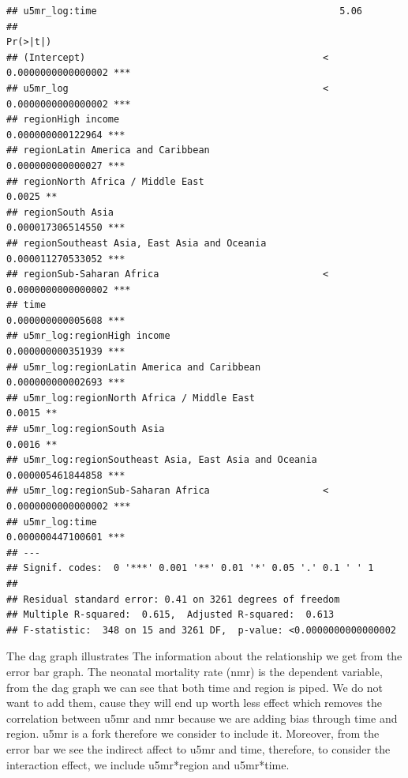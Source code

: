 \documentclass[
]{article}
\begin{document}
\begin{verbatim}
## u5mr_log:time                                           5.06
##                                                                  Pr(>|t|)    
## (Intercept)                                          < 0.0000000000000002 ***
## u5mr_log                                             < 0.0000000000000002 ***
## regionHigh income                                       0.000000000122964 ***
## regionLatin America and Caribbean                       0.000000000000027 ***
## regionNorth Africa / Middle East                                   0.0025 ** 
## regionSouth Asia                                        0.000017306514550 ***
## regionSoutheast Asia, East Asia and Oceania             0.000011270533052 ***
## regionSub-Saharan Africa                             < 0.0000000000000002 ***
## time                                                    0.000000000005608 ***
## u5mr_log:regionHigh income                              0.000000000351939 ***
## u5mr_log:regionLatin America and Caribbean              0.000000000002693 ***
## u5mr_log:regionNorth Africa / Middle East                          0.0015 ** 
## u5mr_log:regionSouth Asia                                          0.0016 ** 
## u5mr_log:regionSoutheast Asia, East Asia and Oceania    0.000005461844858 ***
## u5mr_log:regionSub-Saharan Africa                    < 0.0000000000000002 ***
## u5mr_log:time                                           0.000000447100601 ***
## ---
## Signif. codes:  0 '***' 0.001 '**' 0.01 '*' 0.05 '.' 0.1 ' ' 1
## 
## Residual standard error: 0.41 on 3261 degrees of freedom
## Multiple R-squared:  0.615,  Adjusted R-squared:  0.613 
## F-statistic:  348 on 15 and 3261 DF,  p-value: <0.0000000000000002
\end{verbatim}

The dag graph illustrates The information about the relationship we get
from the error bar graph. The neonatal mortality rate (nmr) is the
dependent variable, from the dag graph we can see that both time and
region is piped. We do not want to add them, cause they will end up
worth less effect which removes the correlation between u5mr and nmr
because we are adding bias through time and region. u5mr is a fork
therefore we consider to include it. Moreover, from the error bar we see
the indirect affect to u5mr and time, therefore, to consider the
interaction effect, we include u5mr*region and u5mr*time.
\end{document}
